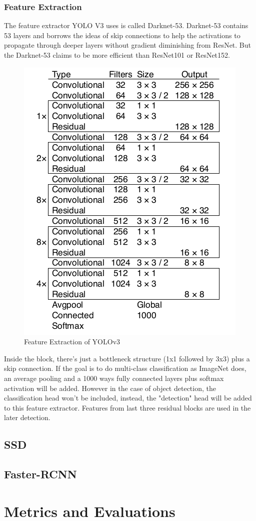         \subsubsection{Feature Extraction}
            The feature extractor YOLO V3 uses is called Darknet-53. Darknet-53 contains 53 layers and borrows the ideas of skip connections to help the activations to propagate through deeper layers without gradient diminishing from ResNet. But the Darknet-53 claims to be more efficient than ResNet101 or ResNet152.
            \begin{figure}[H]
                \centering
                \includegraphics[width=0.8\linewidth]{img/feature_extraction.png}
                \caption{Feature Extraction of YOLOv3}
            \end{figure}
            \vspace{3mm}
            Inside the block, there’s just a bottleneck structure (1x1 followed by 3x3) plus a skip connection. If the goal is to do multi-class classification as ImageNet does, an average pooling and a 1000 ways fully connected layers plus softmax activation will be added. However in the case of object detection, the classification head won't be included, instead, the "detection" head will be added to this feature extractor. Features from last three residual blocks are used in the later detection. 

    \subsection{SSD}

    \subsection{Faster-RCNN}

\section{Metrics and Evaluations}

